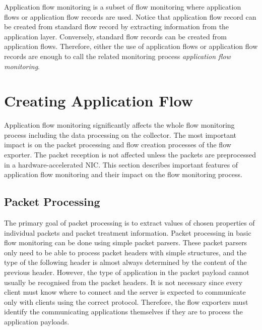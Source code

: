 Application flow monitoring is a subset of flow monitoring where application flows or application flow records are used. Notice that application flow record can be created from standard flow record by extracting information from the application layer. Conversely, standard flow records can be created from application flows. Therefore, either the use of application flows or application flow records are enough to call the related monitoring process \emph{application flow monitoring}.

\section{Creating Application Flow}\label{sec:creating-application-flow}

Application flow monitoring significantly affects the whole flow monitoring process including the data processing on the collector. The most important impact is on the packet processing and flow creation processes of the flow exporter. The packet reception is not affected unless the packets are preprocessed in a hardware-accelerated NIC. This section describes important features of application flow monitoring and their impact on the flow monitoring process.

\subsection{Packet Processing}

The primary goal of packet processing is to extract values of chosen properties of individual packets and packet treatment information. Packet processing in basic flow monitoring can be done using simple packet parsers. These packet parsers only need to be able to process packet headers with simple structures, and the type of the following header is almost always determined by the content of the previous header. However, the type of application in the packet payload cannot usually be recognised from the packet headers. It is not necessary since every client must know where to connect and the server is expected to communicate only with clients using the correct protocol. Therefore, the flow exporters must identify the communicating applications themselves if they are to process the application payloads.

